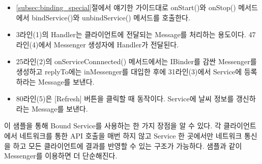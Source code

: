 \begin{itemize}
\item \ref{subsec:binding_special}절에서 얘기한 가이드대로 onStart()와 onStop() 메서드에서 bindService()와 unbindService() 메서드를 호출한다.

\item 3라인(1)의 Handler는 클라이언트에 전달되는 Message를 처리하는 용도이다. 47라인(4)에서 Messenger 생성자에 Handler가 전달된다.

\item 25라인(2)의 onServiceConnnected() 메서드에서는 IBinder를 감싼 Messenger를 생성하고 replyTo에는 inMessenger를 대입한 후에  31라인(3)에서 Service에 등록하라는 Message를  보낸다.

\item 80라인(5)은 [Refresh] 버튼을 클릭할 때 동작이다. Service에 날씨 정보를 갱신하라는 Message를 보낸다.
\end{itemize}

이 샘플을 통해 Bound Service를 사용하는 한 가지 장점을 알 수 있다. 각 클라이언트에서 네트워크를 통한 API 호출을 매번 하지 않고 Service 한 곳에서만 네트워크 통신을 하고 모든 클라이언트에 결과를 반영할 수 있는 구조가 가능하다. 샘플과 같이 Messenger를 이용하면 더 단순해진다.


